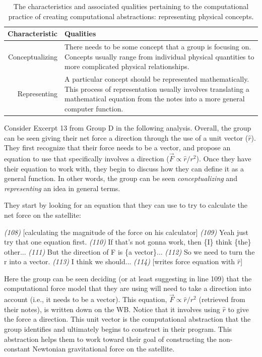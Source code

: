 \documentclass{msuphddissertation}
\begin{document}
\begin{doublespace}
\begin{table}
\begin{tabular}{r|p{}}
Characteristic & Qualities \\\hline\hline
Conceptualizing & There needs to be some concept that a group is focusing on.  Concepts usually range from individual physical quantities to more complicated physical relationships.\\
Representing & A particular concept should be represented mathematically.  This process of representation usually involves translating a mathematical equation from the notes into a more general computer function.
\end{tabular}\caption{The characteristics and associated qualities pertaining to the computational practice of creating computational abstractions: representing physical concepts.}\label{CH5:CreatingAbstractions}
\end{table}

Consider Excerpt 13 from Group D in the following analysis.  Overall, the group can be seen giving their net force a direction through the use of a unit vector ($\hat{r}$).  They first recognize that their force needs to be a vector, and propose an equation to use that specifically involves a direction ($\vec{F}\propto\hat{r}/r^{2}$).  Once they have their equation to work with, they begin to discuss how they can define it as a general function.  In other words, the group can be seen \textit{conceptualizing} and \textit{representing} an idea in general terms.

They start by looking for an equation that they can use to try to calculate the net force on the satellite: \begin{description}
\SA \textit{(108)} [calculating the magnitude of the force on his calculator]
\SC \textit{(109)} Yeah just try that one {equation} first.		
\SC \textit{(110)} If that's not gonna work, then \{I\} think \{the\} other...
\SD \textit{(111)} But the direction of F is \{a vector\}...	
\SD \textit{(112)} So we need to turn the r into a vector.
\SC \textit{(113)} I think we should...		
\SD \textit{(114)} [writes force equation with $\hat{r}$]
\end{description}  Here the group can be seen deciding (or at least suggesting in line 109) that the computational force model that they are using will need to take a direction into account (i.e., it needs to be a vector).  This equation, $\vec{F}\propto\hat{r}/r^{2}$ (retrieved from their notes), is written down on the WB.  Notice that it involves using $\hat{r}$ to give the force a direction.  This unit vector is the computational abstraction that the group identifies and ultimately begins to construct in their program.  This abstraction helps them to work toward their goal of constructing the non-constant Newtonian gravitational force on the satellite.


\end{doublespace}
\end{document}
